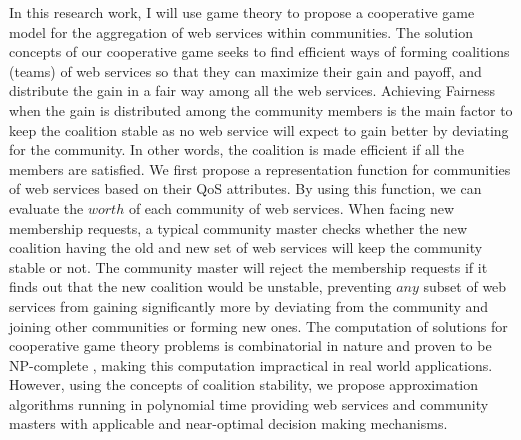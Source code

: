         In this research work, I will use game theory to
        propose a cooperative game model for the aggregation of web
        services within communities. The solution concepts of our
        cooperative game seeks to find efficient ways of forming
        coalitions (teams) of web services so that they can maximize their
        gain and payoff, and distribute the gain in a fair way among all
        the web services. Achieving Fairness when the gain is distributed
        among the community members is the main factor to keep the
        coalition stable as no web service will expect to gain better by
        deviating for the community. In other words, the coalition is made
        efficient if all the members are satisfied. We first propose a
        representation function for communities of web services based on
        their QoS attributes. By using this function, we can evaluate the
        $worth$ of each community of web services. When facing new
        membership requests, a typical community master checks whether the
        new coalition having the old and new set of web services will keep
        the community stable or not. The community master will reject the
        membership requests if it finds out that the new coalition would
        be unstable, preventing $any$ subset of web services from gaining
        significantly more by deviating from the community and joining
        other communities or forming new ones. The computation of
        solutions for cooperative game theory problems is combinatorial in
        nature and proven to be NP-complete \cite{Algorithmic}, making
        this computation impractical in real world applications. However,
        using the concepts of coalition stability, we propose
        approximation algorithms running in polynomial time providing web
        services and community masters with applicable and near-optimal
        decision making mechanisms.




